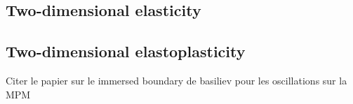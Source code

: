 \subsection{Two-dimensional elasticity}


\subsection{Two-dimensional elastoplasticity}
Citer le papier sur le immersed boundary de basiliev pour les oscillations sur la MPM

%





